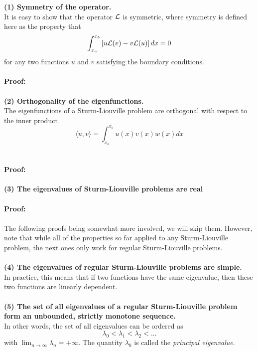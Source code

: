 {\bf (1) Symmetry of the operator.} \\
It is easy to show that the operator ${\cal L}$ is symmetric, where symmetry is defined here as the property that 
\begin{equation}
    \int_{x_a}^{x_b} \left[ u {\cal L}(v) - v {\cal L}(u) \right] dx  = 0 
\end{equation}
for any two functions $u$ and $v$ satisfying the boundary conditions. 
\\
\\
{\color{red} {\bf Proof:}}
\\
\\
{\bf (2) Orthogonality of the eigenfunctions.} \\
The eigenfunctions of a Sturm-Liouville problem are orthogonal with respect to the inner product 
\begin{equation}
    \langle u,v \rangle = \int_{x_a}^{x_b} u(x) v(x) w(x) dx 
\end{equation}
\\
\\
{\color{red} {\bf Proof:}}
\\
\\
  {\bf (3) The eigenvalues of Sturm-Liouville problems are real} 
  \\
\\
{\color{red} {\bf Proof:}}
\\
\\
The following proofs being somewhat more involved, we will skip them. However, note that while all of the properties so far applied to any Sturm-Liouville problem, the next ones only work for regular Sturm-Liouville problems. 
\\
\\
{\bf (4) The eigenvalues of regular Sturm-Liouville problems are simple.}\\
In practice, this means that if two functions have the same eigenvalue, then these two functions are linearly dependent. 
\\
\\
{\bf (5) The set of all eigenvalues of a regular Sturm-Liouville problem form an unbounded, strictly monotone sequence.}\\
In other words, the set of all eigenvalues can be ordered as 
\begin{equation}
    \lambda_0 < \lambda_1 < \lambda_2 < ...
\end{equation}
with $\lim_{n \rightarrow \infty} \lambda_n = + \infty$. The quantity $\lambda_0$ is called the {\it principal eigenvalue}. 
